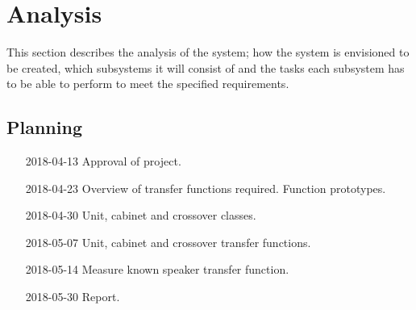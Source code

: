 
\chapter{Analysis}

This section describes the analysis of the system; how the system is envisioned to be created, which subsystems it will consist of and the tasks each subsystem has to be able to perform to meet the specified requirements.

\section{Planning}

\begin{itemize}
	\item[2018-04-13] Approval of project.
	\item[2018-04-23] Overview of transfer functions required. Function prototypes.
	\item[2018-04-30] Unit, cabinet and crossover classes.
	\item[2018-05-07] Unit, cabinet and crossover transfer functions. 
	\item[2018-05-14] Measure known speaker transfer function. 
	\item[2018-05-30] Report.
\end{itemize}

\FloatBarrier
